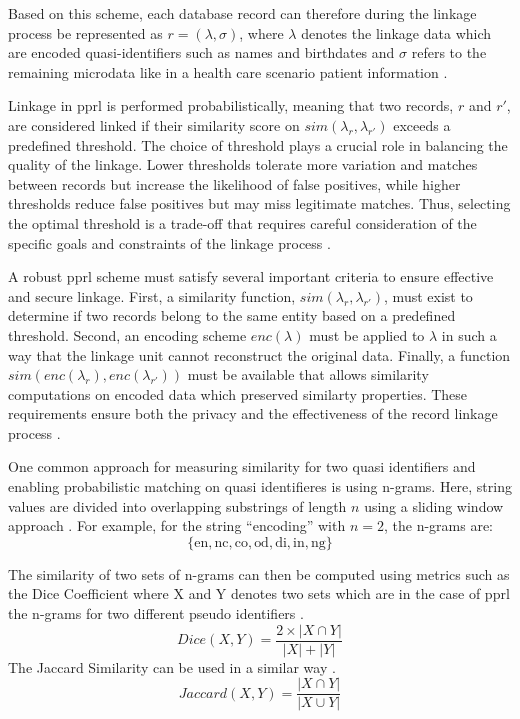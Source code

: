 Based on this scheme, each database record can therefore during the linkage process be represented as $r = (\lambda,  \sigma)$, where $\lambda$ denotes the linkage data which are encoded quasi-identifiers such as names and birthdates and $\sigma$ refers to the remaining microdata like in a health care scenario patient information \cite{schaefer2024}.

Linkage in \ac{pprl} is performed probabilistically, meaning that two records, \(r\) and \(r'\), are considered linked if their similarity score on \(sim(\lambda_r, \lambda_{r'})\) exceeds a predefined threshold.
The choice of threshold plays a crucial role in balancing the quality of the linkage.
Lower thresholds tolerate more variation and matches between records but increase the likelihood of false positives, while higher thresholds reduce false positives but may miss legitimate matches.
Thus, selecting the optimal threshold is a trade-off that requires careful consideration of the specific goals and constraints of the linkage process \cite{schaefer2024}.

A robust \ac{pprl} scheme must satisfy several important criteria to ensure effective and secure linkage.
First, a similarity function, \(sim(\lambda_r, \lambda_{r'})\), must exist to determine if two records belong to the same entity based on a predefined threshold.
Second, an encoding scheme \(enc(\lambda)\)  must be applied to \(\lambda\) in such a way that the linkage unit cannot reconstruct the original data.
Finally, a function \(sim(enc(\lambda_r), enc(\lambda_{r'}))\) must be available that allows similarity computations on encoded data which preserved similarty properties.
These requirements ensure both the privacy and the effectiveness of the record linkage process \cite{schaefer2024}.

One common approach for measuring similarity for two quasi identifiers and enabling probabilistic matching on quasi identifieres is using n-grams.
Here, string values are divided into overlapping substrings of length $n$ using a sliding window approach \cite{schaefer2024}.
For example, for the string ``encoding'' with $n=2$, the n-grams are:
$$ \{\text{en}, \text{nc}, \text{co}, \text{od}, \text{di}, \text{in}, \text{ng} \} $$

The similarity of two sets of n-grams can then be computed using metrics such as the Dice Coefficient where X and Y denotes two sets which are in the case of \ac{pprl} the n-grams for two different pseudo identifiers \cite{schaefer2024}.
  $$ Dice(X, Y) = \frac{2 \times |X \cap Y|}{|X| + |Y|} $$
The Jaccard Similarity can be used in a similar way \cite{schaefer2024}.
  $$ Jaccard(X, Y) = \frac{|X \cap Y|}{|X \cup Y|} $$

